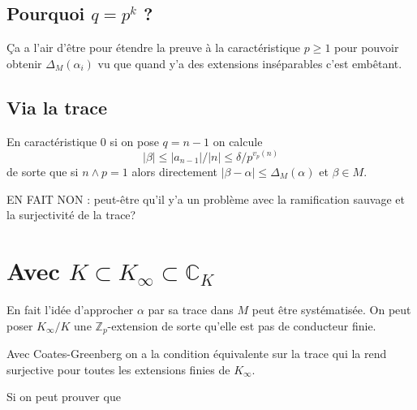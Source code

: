 \documentclass[a4paper,12pt]{article}
\newcommand{\Z}{\mathbb{Z}}
\newcommand{\C}{\mathbb{C}}
\theoremstyle{plain}
\theoremstyle{definition}
\theoremstyle{remark}
\begin{document}
\subsection{Pourquoi $q=p^{k}$ ?}
Ça a l'air d'être pour étendre la preuve à la 
caractéristique $p\geq 1$ pour pouvoir obtenir
$\Delta_M(\alpha_i)$ vu que quand y'a des extensions
inséparables c'est embêtant.
\subsection{Via la trace}
En caractéristique $0$ si on pose $q=n-1$ on calcule
\[|\beta|\leq|a_{n-1}|/|n|\leq \delta/p^{v_p(n)}\]
de sorte que si $n\wedge p=1$ alors directement 
$|\beta-\alpha|\leq \Delta_M(\alpha)$ et $\beta\in M$.

EN FAIT NON : peut-être qu'il y'a un problème avec 
la ramification sauvage et la surjectivité de la trace?


\section{Avec $K\subset K_\infty\subset \C_K$}
En fait l'idée d'approcher $\alpha$ par sa trace dans
$M$ peut être systématisée. On peut poser $K_\infty/K$
une $\Z_p$-extension de sorte qu'elle est pas de 
conducteur finie. 

Avec Coates-Greenberg on a la condition équivalente
sur la trace qui la rend surjective pour toutes les
extensions finies de $K_\infty$.

Si on peut prouver que
\end{document}
